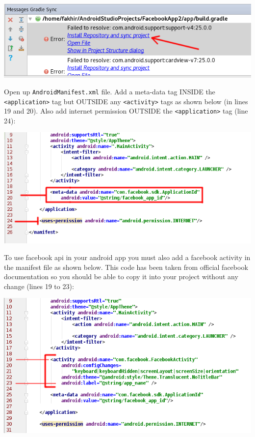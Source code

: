 \begin{center}
	\includegraphics[scale=\SourceCodeScale]{chapters/ch12/images/14}
\end{center}

Open up \texttt{AndroidManifest.xml} file. Add a meta-data tag INSIDE the \texttt{<application>} tag but OUTSIDE any \texttt{<activity>} tags as shown below (in lines 19 and 20). Also add internet permission OUTSIDE the \texttt{<application>} tag (line 24):

\begin{center}
	\includegraphics[scale=\SourceCodeScale]{chapters/ch12/images/11}
\end{center}

To use facebook api in your android app you must also add a facebook activity in the manifest file as shown below. This code has been taken from official facebook documentation so you should be able to copy it into your project without any change (lines 19 to 23):

\begin{center}
	\includegraphics[scale=\SourceCodeScale]{chapters/ch12/images/15}
\end{center}

